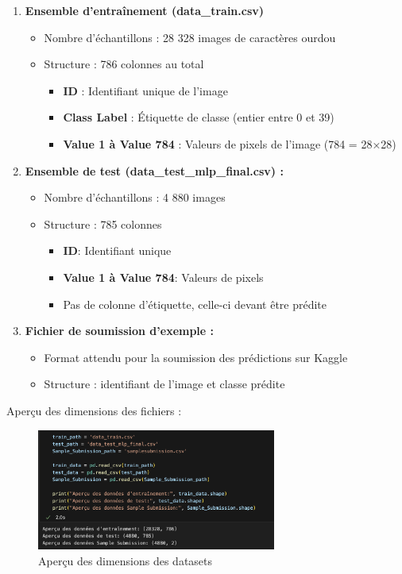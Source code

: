 \begin{enumerate}
\item \textbf{Ensemble d'entraînement (data\_train.csv) }
\begin{itemize}
\item Nombre d'échantillons : 28 328 images de caractères ourdou
\item Structure : 786 colonnes au total
\begin{itemize}
\item \textbf{ID} : Identifiant unique de l'image
\item \textbf{Class Label} : Étiquette de classe (entier entre 0 et 39)
\item \textbf{Value 1 à Value 784} : Valeurs de pixels de l'image (784 = 28×28)
\end{itemize}
\end{itemize}
\item \textbf{Ensemble de test (data\_test\_mlp\_final.csv) :}
\begin{itemize}
\item Nombre d'échantillons : 4 880 images
\item Structure : 785 colonnes
\begin{itemize}
\item \textbf{ID}: Identifiant unique
\item \textbf{Value 1 à Value 784}: Valeurs de pixels
\item Pas de colonne d'étiquette, celle-ci devant être prédite
\end{itemize}
\end{itemize}
\item \textbf{Fichier de soumission d'exemple :}
\begin{itemize}
\item Format attendu pour la soumission des prédictions sur Kaggle
\item Structure : identifiant de l'image et classe prédite
\end{itemize}
\end{enumerate}

Aperçu des dimensions des fichiers :

\begin{figure}[h]
\centering
\includegraphics[width=0.7\textwidth]{figures/Aperçu.png}
\caption{Aperçu des dimensions des datasets}
\label{fig:dim_datasets}
\end{figure}


